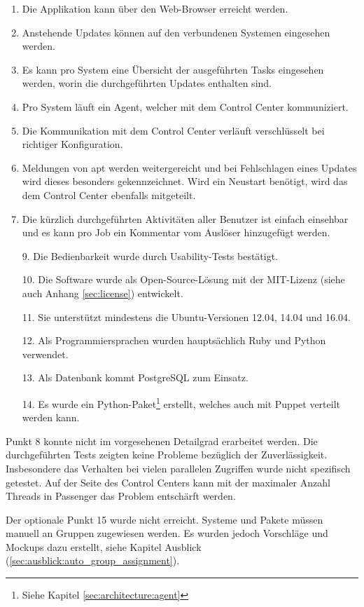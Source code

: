 \begin{enumerate}[noitemsep]
    \item Die Applikation kann über den Web-Browser erreicht werden.
    \item Anstehende Updates können auf den verbundenen Systemen eingesehen werden.
    \item Es kann pro System eine Übersicht der ausgeführten Tasks eingesehen werden, worin die durchgeführten Updates enthalten sind.
    \item Pro System läuft ein Agent, welcher mit dem Control Center kommuniziert.
    \item Die Kommunikation mit dem Control Center verläuft verschlüsselt bei richtiger Konfiguration.
    \item Meldungen von \gls{apt} werden weitergereicht und bei Fehlschlagen eines Updates wird dieses besonders gekennzeichnet. Wird ein Neustart benötigt, wird das dem Control Center ebenfalls mitgeteilt.
    \item Die kürzlich durchgeführten Aktivitäten aller Benutzer ist einfach einsehbar und es kann pro Job ein Kommentar vom Auslöser hinzugefügt werden.
    \item [9.] Die Bedienbarkeit wurde durch Usability-Tests bestätigt.
    \item [10.] Die Software wurde als Open-Source-Lösung mit der MIT-Lizenz (siehe auch Anhang \ref{sec:license}) entwickelt.
    \item [11.] Sie unterstützt mindestens die Ubuntu-Versionen 12.04, 14.04 und 16.04.
    \item [12.] Als Programmiersprachen wurden hauptsächlich Ruby und Python verwendet.
    \item [13.] Als Datenbank kommt PostgreSQL zum Einsatz.
    \item [14.] Es wurde ein Python-Paket\footnote{Siehe Kapitel \ref{sec:architecture:agent}} erstellt, welches auch mit Puppet verteilt werden kann.
\end{enumerate}

Punkt 8 konnte nicht im vorgesehenen Detailgrad erarbeitet werden. Die durchgeführten Tests zeigten keine Probleme bezüglich der Zuverlässigkeit. Insbesondere das Verhalten bei vielen parallelen Zugriffen wurde nicht spezifisch getestet. Auf der Seite des Control Centers kann mit der maximaler Anzahl Threads in Passenger das Problem entschärft werden.

Der optionale Punkt 15 wurde nicht erreicht. Systeme und Pakete müssen manuell an Gruppen zugewiesen werden. Es wurden jedoch Vorschläge und Mockups dazu erstellt, siehe Kapitel Ausblick (\ref{sec:ausblick:auto_group_assignment}).

